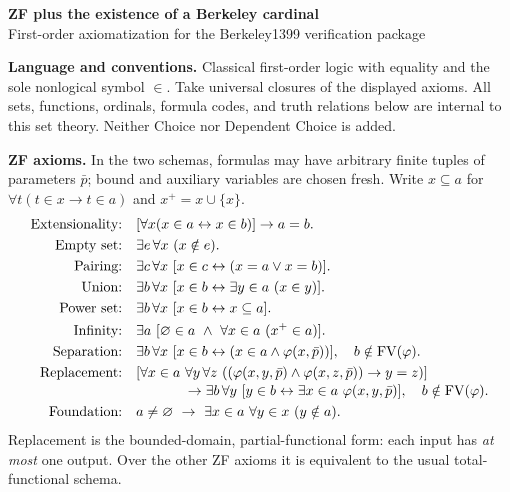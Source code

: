 \documentclass[10pt,letterpaper]{article}
\begin{document}
\begin{center}
{\Large\bfseries ZF plus the existence of a Berkeley cardinal}\\[3pt]
{\small First-order axiomatization for the Berkeley1399 verification package}
\end{center}
\textbf{Language and conventions.}
Classical first-order logic with equality and the sole nonlogical symbol $\in$.
Take universal closures of the displayed axioms. All sets, functions, ordinals,
formula codes, and truth relations below are internal to this set theory.
Neither Choice nor Dependent Choice is added.

\textbf{ZF axioms.} In the two schemas, formulas may have arbitrary finite
tuples of parameters $\bar p$; bound and auxiliary variables are chosen fresh.
Write $x\subseteq a$ for $\forall t(t\in x\to t\in a)$ and $x^+=x\cup\{x\}$.
\begin{align*}
\text{Extensionality:}\quad&[\forall x(x\in a\leftrightarrow x\in b)]\to a=b.\\
\text{Empty set:}\quad&\exists e\,\forall x\ (x\notin e).\\
\text{Pairing:}\quad&\exists c\,\forall x\ [x\in c\leftrightarrow(x=a\lor x=b)].\\
\text{Union:}\quad&\exists b\,\forall x\ [x\in b\leftrightarrow\exists y\in a\ (x\in y)].\\
\text{Power set:}\quad&\exists b\,\forall x\ [x\in b\leftrightarrow x\subseteq a].\\
\text{Infinity:}\quad&\exists a\ [\varnothing\in a\ \land\ \forall x\in a\ (x^+\in a)].\\
\text{Separation:}\quad&\exists b\,\forall x\ [x\in b\leftrightarrow(x\in a\land\varphi(x,\bar p))],
\quad b\notin\mathrm{FV}(\varphi).\\
\text{Replacement:}\quad&[\forall x\in a\ \forall y\,\forall z\
 ((\varphi(x,y,\bar p)\land\varphi(x,z,\bar p))\to y=z)]\\[-2pt]
&\hspace{12mm}\to\exists b\,\forall y\ [y\in b\leftrightarrow\exists x\in a\ \varphi(x,y,\bar p)],
\quad b\notin\mathrm{FV}(\varphi).\\
\text{Foundation:}\quad&a\ne\varnothing\ \to\ \exists x\in a\ \forall y\in x\ (y\notin a).
\end{align*}
Replacement is the bounded-domain, partial-functional form: each input has
\emph{at most} one output. Over the other ZF axioms it is equivalent to the usual
total-functional schema.
\end{document}
